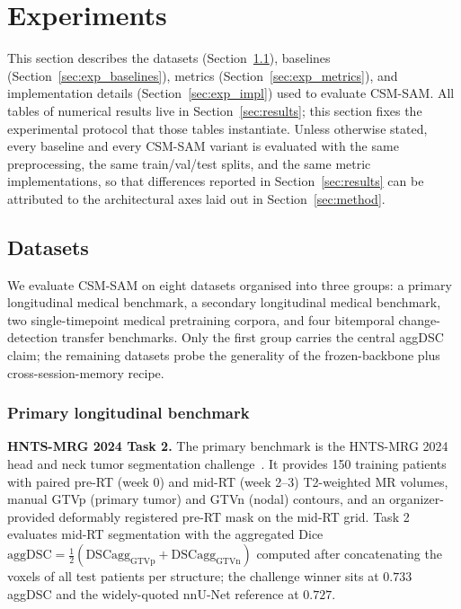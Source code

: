 \section{Experiments}
\label{sec:experiments}

This section describes the datasets (Section~\ref{sec:exp_datasets}),
baselines (Section~\ref{sec:exp_baselines}), metrics
(Section~\ref{sec:exp_metrics}), and implementation details
(Section~\ref{sec:exp_impl}) used to evaluate CSM-SAM. All tables of
numerical results live in Section~\ref{sec:results}; this section fixes
the experimental protocol that those tables instantiate. Unless
otherwise stated, every baseline and every CSM-SAM variant is evaluated
with the same preprocessing, the same train/val/test splits, and the
same metric implementations, so that differences reported in
Section~\ref{sec:results} can be attributed to the architectural axes
laid out in Section~\ref{sec:method}.

\subsection{Datasets}
\label{sec:exp_datasets}

We evaluate CSM-SAM on eight datasets organised into three groups: a
primary longitudinal medical benchmark, a secondary longitudinal
medical benchmark, two single-timepoint medical pretraining corpora,
and four bitemporal change-detection transfer benchmarks. Only the
first group carries the central aggDSC claim; the remaining datasets
probe the generality of the frozen-backbone plus cross-session-memory
recipe.

\subsubsection{Primary longitudinal benchmark}
\label{sec:exp_hnts}

\textbf{HNTS-MRG 2024 Task 2.} The primary benchmark is the
HNTS-MRG 2024 head and neck tumor segmentation
challenge~\cite{wahid2024hntsmrg}. It provides 150 training patients
with paired pre-RT (week 0) and mid-RT (week 2--3) T2-weighted MR
volumes, manual GTVp (primary tumor) and GTVn (nodal) contours, and an
organizer-provided deformably registered pre-RT mask on the mid-RT
grid. Task 2 evaluates mid-RT segmentation with the aggregated Dice
$\mathrm{aggDSC} = \tfrac{1}{2}(\mathrm{DSCagg}_{\mathrm{GTVp}} +
\mathrm{DSCagg}_{\mathrm{GTVn}})$ computed after concatenating the
voxels of all test patients per structure; the challenge winner sits
at $0.733$ aggDSC and the widely-quoted nnU-Net reference at $0.727$.

